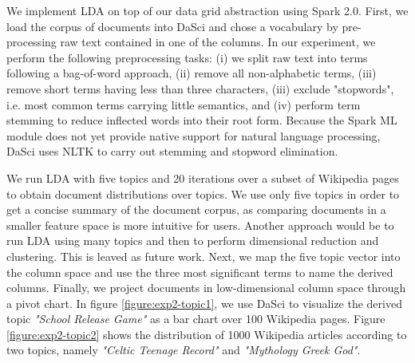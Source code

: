 \documentclass[10pt, a4paper, twocolumn]{article} %
\begin{document}
We implement LDA on top of our data grid abstraction using Spark 2.0. First, we load the corpus of documents into DaSci and chose a vocabulary by pre-processing raw text contained in one of the columns. In our experiment, we perform the following preprocessing tasks: (i) we split raw text into terms following a bag-of-word approach, (ii) remove all non-alphabetic terms, (iii) remove short terms having less than three characters, (iii) exclude "stopwords", i.e. most common terms carrying little semantics, and (iv) perform term stemming to reduce inflected words into their root form.
Because the Spark ML module does not yet provide native support for natural language processing, DaSci uses NLTK to carry out stemming and stopword elimination.
 
We run LDA with five topics and 20 iterations over a subset of Wikipedia pages to obtain document distributions over topics. We use only five topics in order to get a concise summary of the document corpus, as comparing documents in a smaller feature space is more intuitive for users.
Another approach would be to run LDA using many topics and then to perform dimensional reduction and clustering. This is leaved as future work.
Next, we map the five topic vector into the column space and use the three most significant terms to name the derived columns.
Finally, we project documents in low-dimensional column space through a pivot chart.
In figure \ref{figure:exp2-topic1}, we use DaSci to visualize the derived topic \textit{"School Release Game"} as a bar chart over 100 Wikipedia pages.
Figure \ref{figure:exp2-topic2} shows the distribution of 1000 Wikipedia articles according to two topics, namely \textit{"Celtic Teenage Record"} and \textit{"Mythology Greek God"}.
\end{document}
